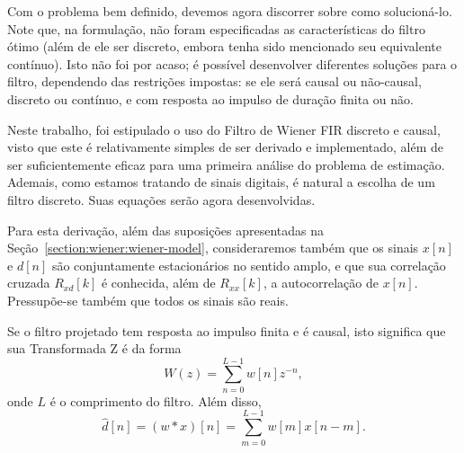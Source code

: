 Com o problema bem definido, devemos agora discorrer sobre como solucioná-lo. Note que, na formulação, não foram especificadas as características do filtro ótimo (além de ele ser discreto, embora tenha sido mencionado seu equivalente contínuo). Isto não foi por acaso; é possível desenvolver diferentes soluções para o filtro, dependendo das restrições impostas: se ele será causal ou não-causal, discreto ou contínuo, e com resposta ao impulso de duração finita ou não.

Neste trabalho, foi estipulado o uso do Filtro de Wiener FIR discreto e causal, visto que este é relativamente simples de ser derivado e implementado, além de ser suficientemente eficaz para uma primeira análise do problema de estimação. Ademais, como estamos tratando de sinais digitais, é natural a escolha de um filtro discreto. Suas equações serão agora desenvolvidas.

Para esta derivação, além das suposições apresentadas na Seção~\ref{section:wiener:wiener-model}, consideraremos também que os sinais $x[n]$ e $d[n]$ são conjuntamente estacionários no sentido amplo, e que sua correlação cruzada $R_{xd}[k]$ é conhecida, além de $R_{xx}[k]$, a autocorrelação de $x[n]$. Pressupõe-se também que todos os sinais são reais.

Se o filtro projetado tem resposta ao impulso finita e é causal, isto significa que sua Transformada Z é da forma
\begin{equation}
    W(z) = \sum_{n=0}^{L-1} w[n] z^{-n},
\end{equation}
onde $L$ é o comprimento do filtro. Além disso,
\begin{equation}
    \hat{d}[n] = (w * x)[n] = \sum_{m = 0}^{L - 1} w[m] x[n - m].
    \label{eq:wf:dhat-conv}
\end{equation}

